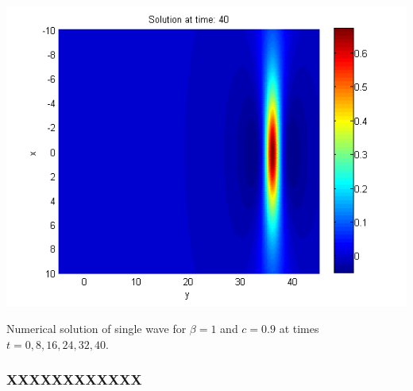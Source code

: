\documentclass{beamer}
\begin{document}
\begin{frame}
\begin{center}
\begin{minipage}[b]{0.30\linewidth}
	\end{minipage}
	\begin{minipage}[b]{0.30\linewidth}
		 \includegraphics[width=\linewidth]{figures/Solution1_t=40.png}
	\end{minipage}
\end{center}
Numerical solution of single wave for $\beta=1$ and $c = 0.9$ at times $t=0,8,16,24,32,40$.
\end{frame}


\begin{frame}
\frametitle{XXXXXXXXXXXX}

\end{frame}
\end{document}
